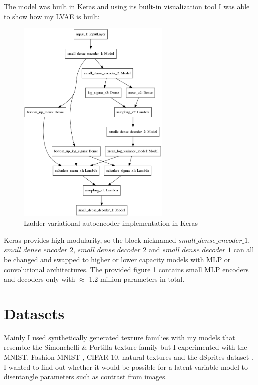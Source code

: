 \documentclass[11pt, english]{article}
\begin{document}
\par The model was built in Keras \cite{chollet2015keras} and using its built-in visualization tool I was able to show how my LVAE is built:

\begin{figure}[H]
    \centering
    \includegraphics[width=0.65\textwidth]{lvae_keras.png}
    \caption{Ladder variational autoencoder implementation in Keras}
    \label{fig:keras_lvae}
\end{figure}

\par Keras provides high modularity, so the block nicknamed $small\_dense\_encoder\_1$, $small\_dense\_encoder\_2$, $small\_dense\_decoder\_2$ and $small\_dense\_decoder\_1$ can all be
changed and swapped to higher or lower capacity models with MLP or convolutional architectures. The provided figure \ref{fig:keras_lvae} contains small MLP encoders and decoders only with $\approx$ 1.2 million parameters in total.

\section{Datasets}

\par Mainly I used synthetically generated texture families with my models that resemble the Simonchelli & Portilla texture family \cite{portilla2003image} but I experimented with the MNIST, Fashion-MNIST \cite{xiao2017fashion}, CIFAR-10, natural textures and the dSprites dataset \cite{matthey2017dsprites}. I wanted to find out whether it would be possible for a latent variable model to disentangle parameters such as contrast from images.
\end{document}
